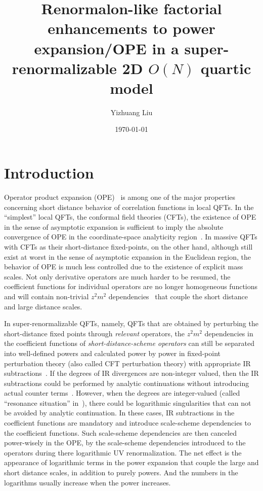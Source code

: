 \documentclass[a4paper,11pt]{article}
\title{Renormalon-like factorial enhancements to power expansion/OPE in a super-renormalizable 2D $O(N)$ quartic model}
\author[a]{Yizhuang Liu}
\affiliation[a]{Institute of Theoretical Physics,
Jagiellonian University, 30-348 Kraków, Poland}
\date{\today}
\begin{document}
\maketitle
\flushbottom
\section{Introduction}
Operator product expansion (OPE)~\cite{Wilson:1970ag} is among one of the major properties concerning short distance behavior of correlation functions in local QFTs. In the ``simplest'' local QFTs, the conformal field theories (CFTs), the existence of OPE in the sense of asymptotic expansion is sufficient to imply the absolute convergence of OPE in the coordinate-space analyticity region~\cite{Luscher:1974ez,Mack:1976pa,Kravchuk:2021kwe}. In massive QFTs with CFTs as their short-distance fixed-points, on the other hand, although still exist at worst in the sense of asymptotic expansion in the Euclidean region, the behavior of OPE is much less controlled due to the existence of explicit mass scales. Not only derivative operators are much harder to be resumed, the coefficient functions for individual operators are no longer homogeneous functions and will contain non-trivial $z^2m^2$ dependencies~\cite{Novikov:1984rf,Zamolodchikov:1990bk,Lukyanov:1996jj} that couple the short distance and large distance scales. 

In super-renormalizable QFTs, namely, QFTs that are obtained by perturbing the short-distance fixed points through {\it relevant} operators, the $z^2m^2$ dependencies in the coefficient functions of {\it short-distance-scheme operators} can still be separated into well-defined powers and calculated power by power in fixed-point perturbation theory (also called CFT perturbation theory) with appropriate IR subtractions~\cite{Chetyrkin:1982zq,Chetyrkin:1983qlc,Zamolodchikov:1990bk}. If the degrees of IR divergences are non-integer valued, then the IR subtractions could be performed by analytic continuations without introducing actual counter terms~\cite{Zamolodchikov:1990bk}. However, when the degrees are integer-valued (called ``resonance situation'' in~\cite{Zamolodchikov:1990bk}), there could be logarithmic singularities that can not be avoided by analytic continuation. In these cases, IR subtractions in the coefficient functions are mandatory and introduce scale-scheme dependencies to the coefficient functions.  Such scale-scheme dependencies are then canceled power-wisely in the OPE, by the scale-scheme dependencies introduced to the operators during there logarithmic UV renormalization. The net effect is the appearance of logarithmic terms in the power expansion that couple the large and short distance scales, in addition to purely powers. And the numbers in the logarithms usually increase when the power increases. 
\end{document}
